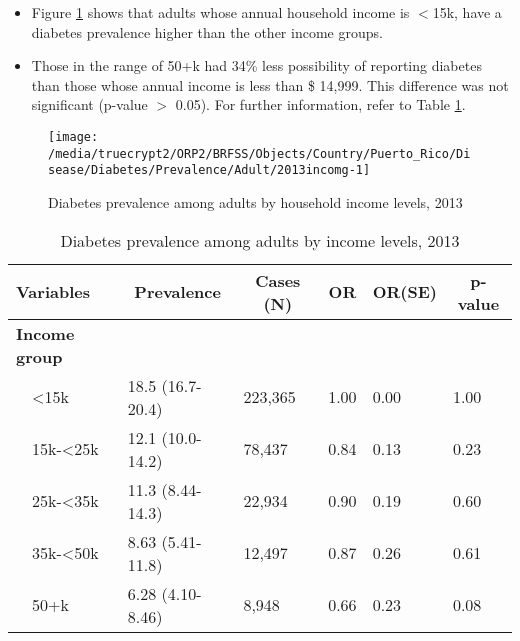  
 
 \newpage
\begin{itemize}

\item Figure \ref{fig:income.Diabetes.2013} shows that adults whose annual household income is 
$<$15k, have a diabetes prevalence higher than the other income groups.

\item Those in the range of 50+k had 34\% less possibility of reporting diabetes than those whose annual income is less than \$ 14,999. This difference was not significant (p-value $>$ 0.05).  For further information, refer to Table \ref{tab:income.Diabetes.2013}.

\end{itemize}

\begin{figure}[H]
\caption{Diabetes prevalence among adults by household income levels, 
         2013}
\begin{knitrout}
\color{fgcolor}

{\centering \texttt{[image: /media/truecrypt2/ORP2/BRFSS/Objects/Country/Puerto\_Rico/Disease/Diabetes/Prevalence/Adult/2013incomg-1]} 

}



\end{knitrout}
 \label{fig:income.Diabetes.2013}
\end{figure}

\begin{table}[H]
\caption{Diabetes prevalence  among adults by income levels, 2013\label{tab:income.Diabetes.2013}} 
\begin{center}
\begin{tabular}{llllll}
\hline\hline
\multicolumn{1}{l}{Variables}&\multicolumn{1}{c}{Prevalence}&\multicolumn{1}{c}{Cases (N)}&\multicolumn{1}{c}{OR}&\multicolumn{1}{c}{OR(SE)}&\multicolumn{1}{c}{p-value}\tabularnewline
\hline
{\bfseries Income group}&&&&&\tabularnewline
~~\textless15k&18.5 (16.7-20.4)&223,365&1.00&0.00&1.00\tabularnewline
~~15k-\textless25k&12.1 (10.0-14.2)& 78,437&0.84&0.13&0.23\tabularnewline
~~25k-\textless35k&11.3 (8.44-14.3)& 22,934&0.90&0.19&0.60\tabularnewline
~~35k-\textless50k&8.63 (5.41-11.8)& 12,497&0.87&0.26&0.61\tabularnewline
~~50+k&6.28 (4.10-8.46)&  8,948&0.66&0.23&0.08\tabularnewline
\hline
\end{tabular}\end{center}

\end{table}

